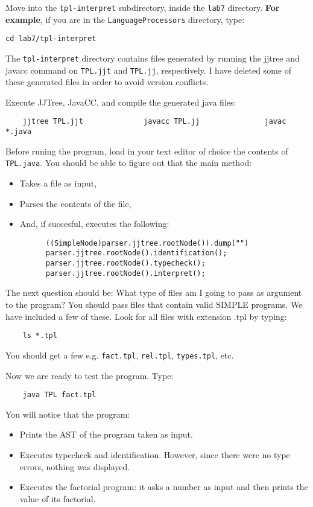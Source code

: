 \documentclass{article}
\begin{document}
Move into the {\tt tpl-interpret} subdirectory, inside the {\tt lab7} directory. \textbf{For example}, if you are in the {\tt LanguageProcessors} directory, type:
\begin{verbatim}
cd lab7/tpl-interpret       
\end{verbatim}

The  {\tt tpl-interpret} directory contains files generated by running the jjtree and javacc command on {\tt TPL.jjt} and {\tt TPL.jj}, respectively. I have deleted some of these generated files in order to avoid version conflicts.

Execute JJTree, JavaCC, and compile the generated java files:

\begin{verbatim}
    jjtree TPL.jjt              javacc TPL.jj               javac *.java
\end{verbatim}

Before runing the program, load in your text editor of choice the contents of {\tt TPL.java}. You should be able to figure out that the main method:
\begin{itemize}
\item Takes a file as input,
\item Parses the contents of the file,
\item And, if succesful, executes the following:
\begin{verbatim}
      ((SimpleNode)parser.jjtree.rootNode()).dump("")
      parser.jjtree.rootNode().identification();
      parser.jjtree.rootNode().typecheck();
      parser.jjtree.rootNode().interpret();
\end{verbatim}
\end{itemize}

The next question should be: What type of files am I going to pass as argument to the program? You should pass files that contain valid SIMPLE programs. We have included a few of these. Look for all files with extension .tpl by typing:
\begin{verbatim}
    ls *.tpl
\end{verbatim}
You should get a few e.g. {\tt fact.tpl}, {\tt rel.tpl}, {\tt types.tpl}, etc.

Now we are ready to test the program. Type:
\begin{verbatim}
    java TPL fact.tpl
\end{verbatim}

You will notice that the program:
\begin{itemize}
\item Prints the AST of the program taken as input.
\item Executes typecheck and identification. However, since there were no type errors, nothing was displayed.
\item Executes the factorial program: it asks a number as input and then prints the value of its factorial.
\end{itemize}
\end{document}
